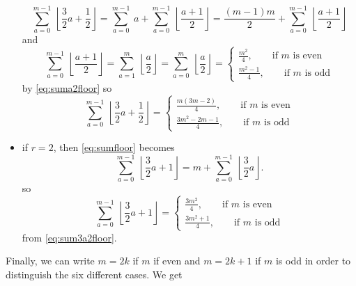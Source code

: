 \documentclass[a4paper,10pt]{article}
\begin{document}
\begin{itemize}
\begin{equation}
                \sum^{m-1}_{a=0}~\left\lfloor \frac{3}{2}a+\frac{1}{2}\right\rfloor = \sum^{m-1}_{a=0}~a+\sum^{m-1}_{a=0}~\left\lfloor \frac{a+1}{2}\right\rfloor = \frac{(m-1)m}{2}+\sum^{m-1}_{a=0}~\left\lfloor \frac{a+1}{2}\right\rfloor
            \end{equation}
            and
            \begin{equation}
                \sum^{m-1}_{a=0}~\left\lfloor \frac{a+1}{2}\right\rfloor = \sum^{m}_{a=1}~\left\lfloor \frac{a}{2}\right\rfloor = \sum^{m}_{a=0}~\left\lfloor \frac{a}{2}\right\rfloor =  
                \begin{cases}
                    \frac{m^2}{4},\qquad\text{if $m$ is even}\\
                    \frac{m^2-1}{4},\qquad\text{if $m$ is odd}
                \end{cases}
            \end{equation}
            by \eqref{eq:suma2floor} so
            \begin{equation}
                \sum^{m-1}_{a=0}~\left\lfloor \frac{3}{2}a+\frac{1}{2}\right\rfloor=
                \begin{cases}
                    \frac{m(3m-2)}{4},\qquad\text{if $m$ is even}\\
                    \frac{3m^2-2m-1}{4},\qquad\text{if $m$ is odd}
                \end{cases}
            \end{equation}
            \item if $r=2$, then \eqref{eq:sumfloor} becomes
            \begin{equation}
                \sum^{m-1}_{a=0}~\left\lfloor \frac{3}{2}a+1\right\rfloor = m+\sum^{m-1}_{a=0}~\left\lfloor \frac{3}{2}a\right\rfloor.
            \end{equation}
            so
            \begin{equation}
                \sum^{m-1}_{a=0}~\left\lfloor \frac{3}{2}a+1\right\rfloor=
                \begin{cases}
                    \frac{3m^2}{4},\qquad\text{if $m$ is even}\\
                    \frac{3m^2+1}{4},\qquad\text{if $m$ is odd}
                \end{cases}
            \end{equation}
            from \eqref{eq:sum3a2floor}.
        \end{itemize}
        Finally, we can write $m=2k$ if $m$ if even and $m=2k+1$ if $m$ is odd in order to distinguish the six different cases. We get
\end{document}
